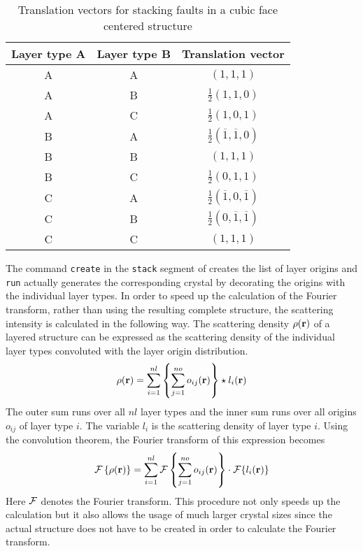 \begin{table}[!tbh]
\centering
\begin{tabular}{|c|c|c|}
  \hline
  {\bf Layer type A} & {\bf Layer type B} & {\bf Translation vector} \\
  \hline\hline
  A & A & $(1, 1, 1)$ \\
  A & B & $\frac{1}{2} (1,1,0)$\\
  A & C & $\frac{1}{2} (1,0,1)$\\
  B & A & $\frac{1}{2} (\overline{1},\overline{1},0)$\\
  B & B & $(1, 1, 1)$\\
  B & C & $\frac{1}{2} (0,1,1)$\\
  C & A & $\frac{1}{2} (\overline{1},0,\overline{1})$\\
  C & B & $\frac{1}{2} (0,\overline{1},\overline{1})$\\
  C & C & $(1, 1, 1)$\\
  \hline
\end{tabular}
\caption{\label{mod-stack-tab1}Translation vectors for stacking
         faults in a cubic face centered structure}
\end{table}
%
The command {\tt create} in the {\tt stack} segment of \Discus
creates the list of layer origins and {\tt run} actually generates
the corresponding crystal by decorating the origins with the
individual layer types.  In order to speed up the calculation of the
Fourier transform, rather than using the resulting complete
structure, the scattering intensity is calculated in the following
way.  The scattering density $\rho ({\bf r})$ of a layered structure
can be expressed as the scattering density of the individual layer
types convoluted with the layer origin distribution.
%
\begin{equation}
    \rho({\bf r}) = \sum_{i=1}^{nl} \left \{ \sum_{j=1}^{no}
                    o_{ij} ({\bf r}) \right \} \star l_{i} ({\bf r})
    \label{mod-stack-eq1}
\end{equation}
%
The outer sum runs over all $nl$ layer types and the inner sum
runs over all origins $o_{ij}$ of layer type $i$.  The variable
$l_{i}$ is the scattering density of layer type $i$.  Using the
convolution theorem, the Fourier transform of this expression
becomes
%
\begin{equation}
    {\cal F} \left \{ \rho({\bf r}) \right \} =
        \sum_{i=1}^{nl}
              {\cal F} \left \{ \sum_{j=1}^{no} o_{ij} ({\bf r}) \right \}
        \cdot {\cal F} \{ l_{i} ({\bf r}) \}
    \label{mod-stack-eq2}
\end{equation}
%
Here ${\cal F}$ denotes the Fourier transform.  This procedure not
only speeds up the calculation but it also allows the usage of much
larger crystal sizes since the actual structure does not have to be
created in order to calculate the Fourier transform.
\par

